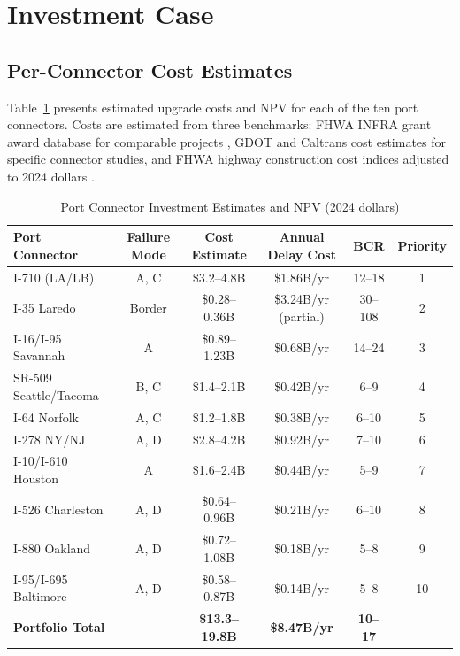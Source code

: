 \section{Investment Case}
\label{sec:investment}

\subsection{Per-Connector Cost Estimates}

Table~\ref{tab:investment} presents estimated upgrade costs and NPV for each of the ten port connectors. Costs are estimated from three benchmarks: FHWA INFRA grant award database for comparable projects \citep{FHWA_freight2023}, GDOT and Caltrans cost estimates for specific connector studies, and FHWA highway construction cost indices adjusted to 2024 dollars \citep{FHWA_costs2023}.

\begin{table}[h]
\centering
\caption{Port Connector Investment Estimates and NPV (2024 dollars)}
\label{tab:investment}
\begin{tabular}{lccccc}
\toprule
Port Connector & Failure Mode & Cost Estimate & Annual Delay Cost & BCR & Priority \\
\midrule
I-710 (LA/LB) & A, C & \$3.2--4.8B & \$1.86B/yr & 12--18 & 1 \\
I-35 Laredo & Border & \$0.28--0.36B & \$3.24B/yr (partial) & 30--108 & 2 \\
I-16/I-95 Savannah & A & \$0.89--1.23B & \$0.68B/yr & 14--24 & 3 \\
SR-509 Seattle/Tacoma & B, C & \$1.4--2.1B & \$0.42B/yr & 6--9 & 4 \\
I-64 Norfolk & A, C & \$1.2--1.8B & \$0.38B/yr & 6--10 & 5 \\
I-278 NY/NJ & A, D & \$2.8--4.2B & \$0.92B/yr & 7--10 & 6 \\
I-10/I-610 Houston & A & \$1.6--2.4B & \$0.44B/yr & 5--9 & 7 \\
I-526 Charleston & A, D & \$0.64--0.96B & \$0.21B/yr & 6--10 & 8 \\
I-880 Oakland & A, D & \$0.72--1.08B & \$0.18B/yr & 5--8 & 9 \\
I-95/I-695 Baltimore & A, D & \$0.58--0.87B & \$0.14B/yr & 5--8 & 10 \\
\midrule
\textbf{Portfolio Total} & & \textbf{\$13.3--19.8B} & \textbf{\$8.47B/yr} & \textbf{10--17} & \\
\bottomrule
\end{tabular}
\end{table}

